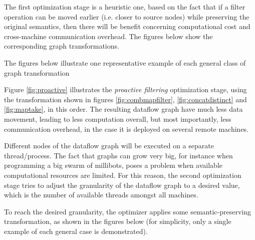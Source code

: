 \documentclass{dithesis}
\begin{document}

The first optimization stage is a heuristic one, based on the fact that if a filter operation can be moved earlier (i.e. closer to source nodes) while preserving the original semantics, then there will be benefit concerning computational cost and cross-machine communication overhead. The figures below show the corresponding graph transformations.


The figures below illustrate one representative example of each general class of graph transformation


\newpage
{}

Figure \ref{fig:proactive} illustrates the \textit{proactive filtering} optimization stage, using the transformation shown in figures \ref{fig:combmapfilter}, \ref{fig:concatdistinct} and \ref{fig:maptake}, in this order. The resulting dataflow graph have much less data movement, leading to less computation overall, but most importantly, less communication overhead, in the case it is deployed on several remote machines.



Different nodes of the dataflow graph will be executed on a separate thread/process. The fact that graphs can grow very big, for instance when programming a big swarm of millibots\cite{army}, poses a problem when available computational resources are limited. For this reason, the second optimization stage tries to adjust the granularity of the dataflow graph to a desired value, which is the number of available threads amongst all machines. 


To reach the desired granularity, the optimizer applies some semantic-preserving transformation, as shown in the figures below (for simplicity, only a single example of each general case is demonstrated). 

\end{document}
